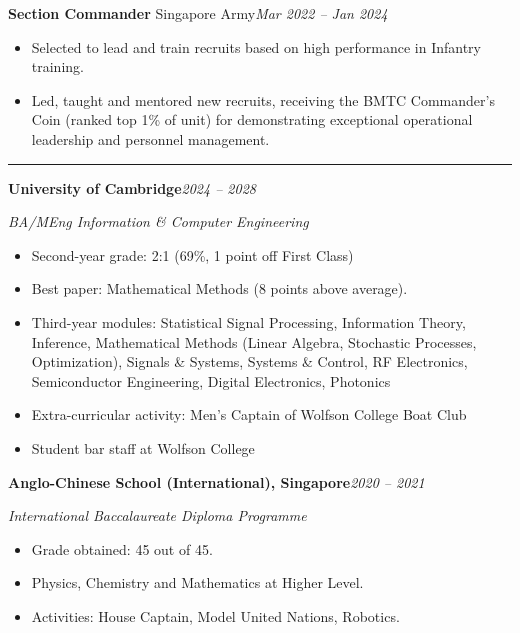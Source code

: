 \documentclass[11pt]{article}
\newcommand{\cvsection}[1]{%
  \vspace{10pt}%
  \noindent{\large\bfseries\MakeUppercase{#1}}\par
  \vspace{-4pt}\noindent\rule{\linewidth}{0.7pt}\vspace{4pt}%
}
\begin{document}
\vspace{4pt}
\noindent\textbf{Section Commander} Singapore Army\hfill\textit{Mar 2022 -- Jan 2024}\par
\begin{itemize}
  \item Selected to lead and train recruits based on high performance in Infantry training.
  \item Led, taught and mentored new recruits, receiving the BMTC Commander's Coin (ranked top 1\% of unit) for demonstrating exceptional operational leadership and personnel management.
\end{itemize}

\cvsection{Education}

\noindent\textbf{University of Cambridge}\hfill\textit{2024 -- 2028}\par
\textit{BA/MEng Information \& Computer Engineering}
\begin{itemize}
  \item Second-year grade: 2:1 (69\%, 1 point off First Class)
  \item Best paper: Mathematical Methods (8 points above average).
  \item Third-year modules: Statistical Signal Processing, Information Theory, Inference, Mathematical Methods (Linear Algebra, Stochastic Processes, Optimization), Signals \& Systems, Systems \& Control, RF Electronics, Semiconductor Engineering, Digital Electronics, Photonics
  \item Extra-curricular activity: Men's Captain of Wolfson College Boat Club
  \item Student bar staff at Wolfson College
\end{itemize}

\vspace{4pt}
\noindent\textbf{Anglo-Chinese School (International), Singapore}\hfill\textit{2020 -- 2021}\par
\textit{International Baccalaureate Diploma Programme}
\begin{itemize}
  \item Grade obtained: 45 out of 45.
  \item Physics, Chemistry and Mathematics at Higher Level.
  \item Activities: House Captain, Model United Nations, Robotics.
\end{itemize}
\end{document}
